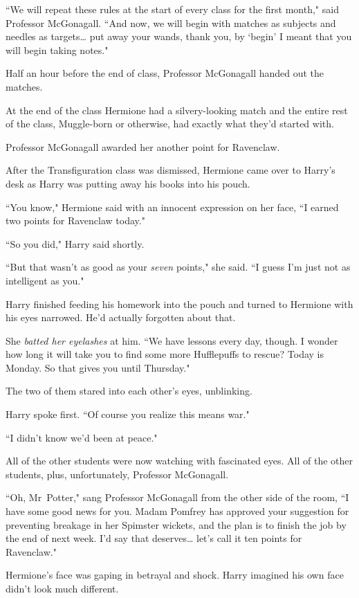 ``We will repeat these rules at the start of every class for the first month," said Professor McGonagall. ``And now, we will begin with matches as subjects and needles as targets{\ldots} put away your wands, thank you, by `begin' I meant that you will begin taking notes."

Half an hour before the end of class, Professor McGonagall handed out the matches.

At the end of the class Hermione had a silvery-looking match and the entire rest of the class, Muggle-born or otherwise, had exactly what they'd started with.

Professor McGonagall awarded her another point for Ravenclaw.

\later

After the Transfiguration class was dismissed, Hermione came over to Harry's desk as Harry was putting away his books into his pouch.

``You know," Hermione said with an innocent expression on her face, ``I earned two points for Ravenclaw today."

``So you did," Harry said shortly.

``But that wasn't as good as your \emph{seven} points," she said. ``I guess I'm just not as intelligent as you."

Harry finished feeding his homework into the pouch and turned to Hermione with his eyes narrowed. He'd actually forgotten about that.

She \emph{batted her eyelashes} at him. ``We have lessons every day, though. I wonder how long it will take you to find some more Hufflepuffs to rescue? Today is Monday. So that gives you until Thursday."

The two of them stared into each other's eyes, unblinking.

Harry spoke first. ``Of course you realize this means war."

``I didn't know we'd been at peace."

All of the other students were now watching with fascinated eyes. All of the other students, plus, unfortunately, Professor McGonagall.

``Oh, Mr~Potter," sang Professor McGonagall from the other side of the room, ``I have some good news for you. Madam Pomfrey has approved your suggestion for preventing breakage in her Spimster wickets, and the plan is to finish the job by the end of next week. I'd say that deserves{\ldots} let's call it ten points for Ravenclaw."

Hermione's face was gaping in betrayal and shock. Harry imagined his own face didn't look much different.

